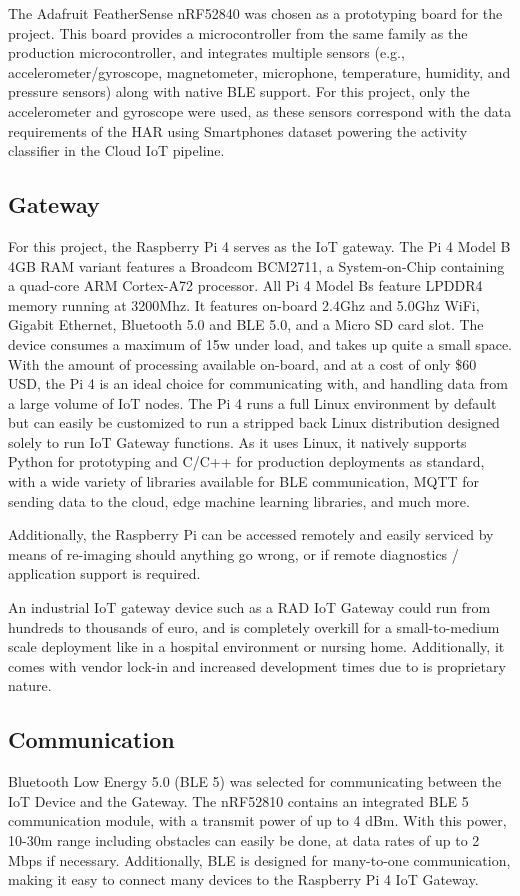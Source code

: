 \documentclass[conference]{IEEEtran}
\begin{document}
The Adafruit FeatherSense nRF52840\cite{b7} was chosen as a prototyping board for the project. This board provides a microcontroller from the same family as the production microcontroller, and integrates multiple sensors (e.g., accelerometer/gyroscope, magnetometer, microphone, temperature, humidity, and pressure sensors) along with native BLE support. For this project, only the accelerometer and gyroscope were used, as these sensors correspond with the data requirements of the HAR using Smartphones dataset \cite{b5,b6} powering the activity classifier in the Cloud IoT pipeline.

\subsection{Gateway}
For this project, the Raspberry Pi 4 serves as the IoT gateway. The Pi 4 Model B 4GB RAM variant features a Broadcom BCM2711, a System-on-Chip containing a quad-core ARM Cortex-A72 processor. All Pi 4 Model Bs feature LPDDR4 memory running at 3200Mhz. It features on-board 2.4Ghz and 5.0Ghz WiFi, Gigabit Ethernet, Bluetooth 5.0 and BLE 5.0, and a Micro SD card slot. The device consumes a maximum of 15w under load, and takes up quite a small space. With the amount of processing available on-board, and at a cost of only \$60 USD, the Pi 4 is an ideal choice for communicating with, and handling data from a large volume of IoT nodes. The Pi 4 runs a full Linux environment by default but can easily be customized to run a stripped back Linux distribution designed solely to run IoT Gateway functions. As it uses Linux, it natively supports Python for prototyping and C/C++ for production deployments as standard, with a wide variety of libraries available for BLE communication, MQTT for sending data to the cloud, edge machine learning libraries, and much more.

Additionally, the Raspberry Pi can be accessed remotely and easily serviced by means of re-imaging should anything go wrong, or if remote diagnostics / application support is required.

An industrial IoT gateway device such as a RAD IoT Gateway could run from hundreds to thousands of euro, and is completely overkill for a small-to-medium scale deployment like in a hospital environment or nursing home. Additionally, it comes with vendor lock-in and increased development times due to is proprietary nature.

\subsection{Communication}
Bluetooth Low Energy 5.0 (BLE 5) was selected for communicating between the IoT Device and the Gateway. The nRF52810 contains an integrated BLE 5 communication module, with a transmit power of up to 4 dBm. With this power, 10-30m range including obstacles can easily be done, at data rates of up to 2 Mbps if necessary. Additionally, BLE is designed for many-to-one communication, making it easy to connect many devices to the Raspberry Pi 4 IoT Gateway.
\end{document}
